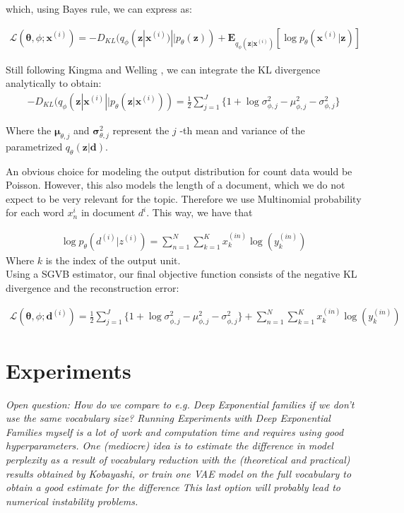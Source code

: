 \documentclass{report}
\begin{document}
	which, using Bayes rule, we can express as:
	
	\begin{align}
	\mathcal{L}(\mathbf{\theta}, \phi; \mathbf{x}^{(i)}) = -D_{KL}(q_\phi (\mathbf{z}| \mathbf{x}^{(i)})||p_\theta (\mathbf{z})) + \mathbf{E}_{q_\phi(\mathbf{z}|\mathbf{x}^{(i)})}[\log p_\theta (\mathbf{x}^{(i)}|\mathbf{z})]
	\end{align}

	
	
	Still following Kingma and Welling \cite{kingma2013auto}, we can integrate the KL divergence analytically to obtain: \\
	

	\begin{align}
	- D_{KL}(q_\phi (\mathbf{z}| \mathbf{x}^{(i)}||p_\theta (\mathbf{z}| \mathbf{x}^{(i)})) = \frac{1}{2}\sum\limits_{j=1}^{J}\{1+\log \sigma_{\phi ,j}^2 - \mu_{\phi,j}^2 - \sigma_{\phi ,j}^2\}
	\end{align}
	
	Where the $\mathbf{\mu}_{\theta,j}$ and $\mathbf{\sigma}_{\theta,j}^2$ represent the $j$ -th mean and variance of the parametrized $q_\theta(\mathbf{z}|\mathbf{d})$.
	
	An obvious choice for modeling the output distribution for count data would be Poisson. However, this also models the length of a document, which we do not expect to be very relevant for the topic. Therefore we use Multinomial probability for each word $x_n^{i}$ in document $d^{i}$. This way, we have that
	
	\begin{align}
	\log p_{\theta}(d^{(i)}|z^{(i)}) = 
	\sum_{n=1}^N
	\sum_{k=1}^K x_k^{(in)} \log (y_k^{(in)})
	\end{align}
	Where $k$ is the index of the output unit.\\
	
	
	Using a SGVB estimator, our final objective function consists of the negative KL divergence and the reconstruction error:
	
	\begin{align}
	\mathcal{L}(\mathbf{\theta}, \phi; \mathbf{d}^{(i)}) = \frac{1}{2}\sum\limits_{j=1}^{J}\{1+\log \sigma_{\phi ,j}^2 - \mu_{\phi,j}^2 - \sigma_{\phi ,j}^2\} 
	+ \sum_{n=1}^N
	\sum_{k=1}^K x_k^{(in)} \log (y_k^{(in)})
	\end{align}

\section{Experiments}
	\textit{Open question: How do we compare to e.g. Deep Exponential families if we don't use the same vocabulary size? Running Experiments with Deep Exponential Families myself is a lot of work and computation time and requires using good hyperparameters. One (mediocre) idea is to estimate the difference in model perplexity as a result of vocabulary reduction with the (theoretical and practical) results obtained by Kobayashi, or train one VAE model on the full vocabulary to obtain a good estimate for the difference This last option will probably lead to numerical instability problems.}
\end{document}
